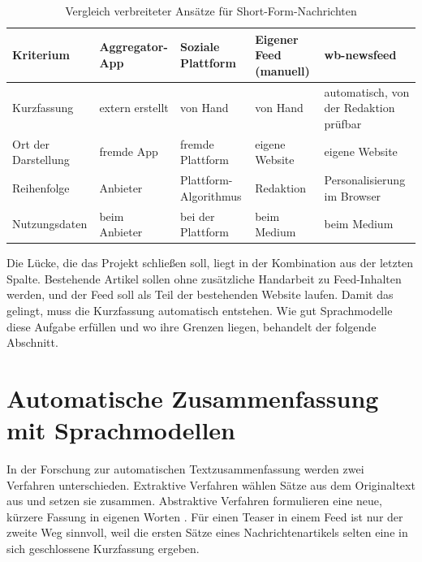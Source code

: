 \begin{table}
    \centering
    \small
    \begin{tabularx}{\textwidth}{>{\raggedright\arraybackslash}X >{\raggedright\arraybackslash}X >{\raggedright\arraybackslash}X >{\raggedright\arraybackslash}X >{\raggedright\arraybackslash}X}
        \toprule
        \textbf{Kriterium} & \textbf{Aggregator-App} & \textbf{Soziale Plattform} & \textbf{Eigener Feed (manuell)} & \textbf{wb-newsfeed} \\
        \midrule
        Kurzfassung & extern erstellt & von Hand & von Hand & automatisch, von der Redaktion prüfbar \\
        Ort der Darstellung & fremde App & fremde Plattform & eigene Website & eigene Website \\
        Reihenfolge & Anbieter & Plattform-Algorithmus & Redaktion & Personalisierung im Browser \\
        Nutzungsdaten & beim Anbieter & bei der Plattform & beim Medium & beim Medium \\
        \bottomrule
    \end{tabularx}
    \caption{Vergleich verbreiteter Ansätze für Short-Form-Nachrichten}
    \label{tab:related:comparison}
\end{table}

Die Lücke, die das Projekt schließen soll, liegt in der Kombination aus der letzten Spalte.
Bestehende Artikel sollen ohne zusätzliche Handarbeit zu Feed-Inhalten werden, und der Feed soll als Teil der bestehenden Website laufen.
Damit das gelingt, muss die Kurzfassung automatisch entstehen.
Wie gut Sprachmodelle diese Aufgabe erfüllen und wo ihre Grenzen liegen, behandelt der folgende Abschnitt.

\section{Automatische Zusammenfassung mit Sprachmodellen}\label{sec:related:summarization}
\setauthor{\firstauthor}

In der Forschung zur automatischen Textzusammenfassung werden zwei Verfahren unterschieden.
Extraktive Verfahren wählen Sätze aus dem Originaltext aus und setzen sie zusammen.
Abstraktive Verfahren formulieren eine neue, kürzere Fassung in eigenen Worten \cite{maynez2020faithfulness}.
Für einen Teaser in einem Feed ist nur der zweite Weg sinnvoll, weil die ersten Sätze eines Nachrichtenartikels selten eine in sich geschlossene Kurzfassung ergeben.

